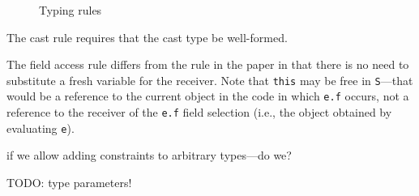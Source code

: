 \begin{figure}

\caption{Typing rules}
\label{fig:typing}
\end{figure}

The cast rule
requires that the cast type be well-formed. 

The field access rule 
differs from the rule in the paper in that there is no need to
substitute a fresh variable for the receiver. Note that {\tt this} may be free
in {\tt S}---that would be a reference to the current object in the code in
which {\tt e.f} occurs, not a reference to the receiver of the {\tt e.f} field
selection (i.e., the object obtained by evaluating {\tt e}).

\noindent
if we allow adding constraints to arbitrary types---do we?

TODO: type parameters!

